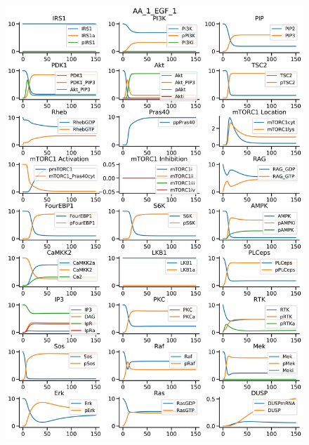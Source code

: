 \documentclass{beamer}
\begin{document}
\begin{frame}
\begin{figure}
\begin{minipage}{0.45\textwidth}
        \includegraphics[width=\textwidth]{../simulations/ExtendedPI3KModel/validations/AAWithEGF/AA_1_EGF_1-3.png}
    \end{minipage}
\end{figure}
\end{frame}

\end{document}
